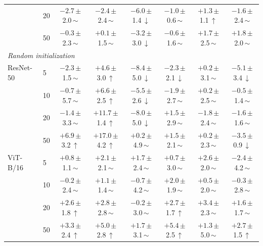 \begin{table}[htbp]
\begin{tabular}{llcccccc}
 & 20 & $-2.7$\,{\scriptsize$\pm$2.0}\,$\sim$ & $-2.4$\,{\scriptsize$\pm$2.4}\,$\sim$ & $-6.0$\,{\scriptsize$\pm$1.4}\,$\downarrow$ & $-1.0$\,{\scriptsize$\pm$0.6}\,$\sim$ & $+1.3$\,{\scriptsize$\pm$1.1}\,$\uparrow$ & $-1.6$\,{\scriptsize$\pm$2.4}\,$\sim$ \\
 & 50 & $-0.3$\,{\scriptsize$\pm$2.3}\,$\sim$ & $+0.1$\,{\scriptsize$\pm$1.5}\,$\sim$ & $-3.2$\,{\scriptsize$\pm$3.0}\,$\downarrow$ & $-0.6$\,{\scriptsize$\pm$1.6}\,$\sim$ & $+1.7$\,{\scriptsize$\pm$2.5}\,$\sim$ & $+1.8$\,{\scriptsize$\pm$2.0}\,$\sim$ \\
\midrule
\multicolumn{8}{l}{\textit{Random initialization}} \\
ResNet-50 & 5 & $-2.3$\,{\scriptsize$\pm$1.5}\,$\sim$ & $+4.6$\,{\scriptsize$\pm$3.0}\,$\uparrow$ & $-8.4$\,{\scriptsize$\pm$5.0}\,$\downarrow$ & $-2.3$\,{\scriptsize$\pm$2.1}\,$\downarrow$ & $+0.2$\,{\scriptsize$\pm$3.1}\,$\sim$ & $-5.1$\,{\scriptsize$\pm$3.4}\,$\downarrow$ \\
 & 10 & $-0.7$\,{\scriptsize$\pm$5.7}\,$\sim$ & $+6.6$\,{\scriptsize$\pm$2.5}\,$\uparrow$ & $-5.5$\,{\scriptsize$\pm$2.6}\,$\downarrow$ & $-1.9$\,{\scriptsize$\pm$2.7}\,$\sim$ & $+0.2$\,{\scriptsize$\pm$2.5}\,$\sim$ & $-0.5$\,{\scriptsize$\pm$1.4}\,$\sim$ \\
 & 20 & $-1.4$\,{\scriptsize$\pm$3.3}\,$\sim$ & $+11.7$\,{\scriptsize$\pm$1.4}\,$\uparrow$ & $-8.0$\,{\scriptsize$\pm$5.0}\,$\downarrow$ & $+1.5$\,{\scriptsize$\pm$2.9}\,$\sim$ & $-1.8$\,{\scriptsize$\pm$2.4}\,$\sim$ & $-1.6$\,{\scriptsize$\pm$1.6}\,$\sim$ \\
 & 50 & $+6.9$\,{\scriptsize$\pm$3.2}\,$\uparrow$ & $+17.0$\,{\scriptsize$\pm$4.2}\,$\uparrow$ & $+0.2$\,{\scriptsize$\pm$4.9}\,$\sim$ & $+1.5$\,{\scriptsize$\pm$2.1}\,$\sim$ & $+0.2$\,{\scriptsize$\pm$2.3}\,$\sim$ & $-3.5$\,{\scriptsize$\pm$0.9}\,$\downarrow$ \\
\addlinespace[2pt]
ViT-B/16 & 5 & $+0.8$\,{\scriptsize$\pm$1.1}\,$\sim$ & $+2.1$\,{\scriptsize$\pm$2.1}\,$\sim$ & $+1.7$\,{\scriptsize$\pm$2.4}\,$\sim$ & $+0.7$\,{\scriptsize$\pm$3.0}\,$\sim$ & $+2.6$\,{\scriptsize$\pm$2.0}\,$\sim$ & $-2.4$\,{\scriptsize$\pm$4.2}\,$\sim$ \\
 & 10 & $-0.2$\,{\scriptsize$\pm$2.4}\,$\sim$ & $+1.1$\,{\scriptsize$\pm$1.4}\,$\sim$ & $-0.7$\,{\scriptsize$\pm$4.2}\,$\sim$ & $+2.0$\,{\scriptsize$\pm$1.9}\,$\sim$ & $+0.5$\,{\scriptsize$\pm$2.0}\,$\sim$ & $-0.3$\,{\scriptsize$\pm$2.8}\,$\sim$ \\
 & 20 & $+2.6$\,{\scriptsize$\pm$1.8}\,$\uparrow$ & $+2.8$\,{\scriptsize$\pm$2.8}\,$\sim$ & $-0.2$\,{\scriptsize$\pm$3.0}\,$\sim$ & $+2.7$\,{\scriptsize$\pm$1.7}\,$\uparrow$ & $+3.4$\,{\scriptsize$\pm$2.3}\,$\sim$ & $+1.6$\,{\scriptsize$\pm$1.7}\,$\sim$ \\
 & 50 & $+3.3$\,{\scriptsize$\pm$2.4}\,$\uparrow$ & $+5.0$\,{\scriptsize$\pm$2.8}\,$\uparrow$ & $+1.7$\,{\scriptsize$\pm$3.1}\,$\sim$ & $+5.4$\,{\scriptsize$\pm$2.5}\,$\uparrow$ & $+1.3$\,{\scriptsize$\pm$5.0}\,$\sim$ & $+2.7$\,{\scriptsize$\pm$1.5}\,$\uparrow$ \\
\bottomrule
\end{tabular}
\end{table}
